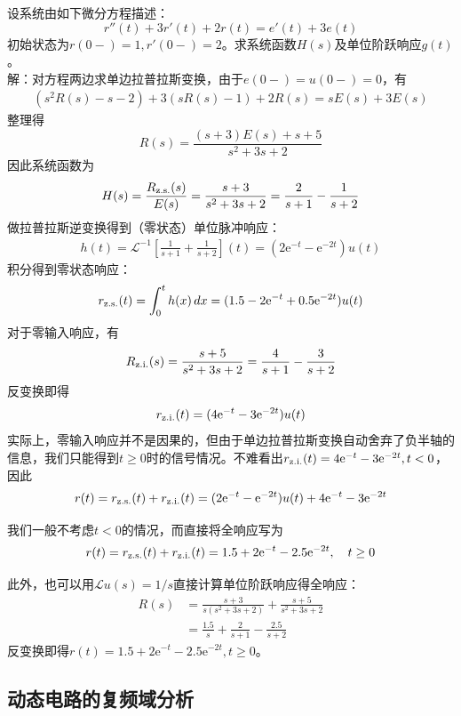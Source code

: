 \begin{example}[常系数线性微分方程]
    设系统由如下微分方程描述：
    \[r''(t)+3r'(t)+2r(t)=e'(t)+3e(t)\]
    初始状态为$r(0-)=1,r'(0-)=2$。求系统函数$H(s)$及单位阶跃响应$g(t)$。\\
    解：对方程两边求单边拉普拉斯变换，由于$e(0-)=u(0-)=0$，有
    \begin{align*}
        \left(s^2 R(s)-s-2\right)+3\left(s R(s)-1\right)+2 R(s)=sE(s)+3E(s)
    \end{align*}
    整理得
    \[R(s)=\frac{(s+3)E(s)+s+5}{s^2+3s+2}\]
    因此系统函数为
    \[H(s)=\frac{R_{\operatorname{z.s.}}(s)}{E(s)}=\frac{s+3}{s^2+3s+2}=\frac{2}{s+1}-\frac{1}{s+2}\]
    做拉普拉斯逆变换得到（零状态）单位脉冲响应：
    \begin{align*}
        h(t)=\mathcal{L}^{-1} \left[\frac{1}{s+1}+\frac{1}{s+2}\right](t)=(2\mathrm{e}^{-t}-\mathrm{e}^{-2t})u(t)
    \end{align*}
    积分得到零状态响应：
    \begin{align*}
    r_{\operatorname{z.s.}}(t)=\int_0^{t}h(x)\,dx=(1.5-2\mathrm{e}^{-t}+0.5\mathrm{e}^{-2t})u(t)
    \end{align*}
    对于零输入响应，有
    \begin{align*}
        R_{\operatorname{z.i.}}(s)=\frac{s+5}{s^2+3s+2}=\frac{4}{s+1}-\frac{3}{s+2}
    \end{align*}
    反变换即得$$r_{\operatorname{z.i.}}(t)=(4\mathrm{e}^{-t}-3\mathrm{e}^{-2t})u(t)$$
    实际上，零输入响应并不是因果的，但由于单边拉普拉斯变换自动舍弃了负半轴的信息，我们只能得到$t\geq 0$时的信号情况。不难看出$r_{\operatorname{z.i.}}(t)=4\mathrm{e}^{-t}-3\mathrm{e}^{-2t},t<0$，因此
    $$r(t)=r_{\operatorname{z.s.}}(t)+r_{\operatorname{z.i.}}(t)=(2\mathrm{e}^{-t}-\mathrm{e}^{-2t})u(t)+4\mathrm{e}^{-t}-3\mathrm{e}^{-2t}$$

    我们一般不考虑$t<0$的情况，而直接将全响应写为
    $$r(t)=r_{\operatorname{z.s.}}(t)+r_{\operatorname{z.i.}}(t)=1.5+2\mathrm{e}^{-t}-2.5\mathrm{e}^{-2t},\quad t\geq 0$$

    此外，也可以用$\mathcal{L} u(s)=1/s$直接计算单位阶跃响应得全响应：
    \begin{align*}
        R(s)&=\frac{s+3}{s(s^2+3s+2)}+\frac{s+5}{s^2+3s+2}\\
        &=\frac{1.5}{s}+\frac{2}{s+1}-\frac{2.5}{s+2}
    \end{align*}
    反变换即得$r(t)=1.5+2\mathrm{e}^{-t}-2.5\mathrm{e}^{-2t},t\geq 0$。
\end{example}

\subsection{动态电路的复频域分析}\label{sub:laplace_circuit}

